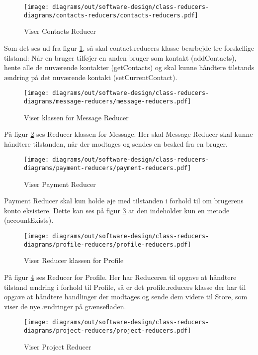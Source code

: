 \begin{figure}[H]
    \centering
\texttt{[image: diagrams/out/software-design/class-reducers-diagrams/contacts-reducers/contacts-reducers.pdf]}
\caption{Viser Contacts Reducer}
\label{fig:contact}
\end{figure}

Som det ses ud fra figur \ref{fig:contact}, så skal contact.reducers klasse bearbejde tre forskellige tilstand: Når en bruger tilføjer en anden bruger som kontakt (addContacts), hente alle de nuværende kontakter (getContacts) og skal kunne håndtere tilstands ændring på det nuværende kontakt (setCurrentContact).

\begin{figure}[H]
    \centering
\texttt{[image: diagrams/out/software-design/class-reducers-diagrams/message-reducers/message-reducers.pdf]}
\caption{Viser klassen for Message Reducer}
\label{fig:messagereducer}
\end{figure}

På figur \ref{fig:messagereducer} ses Reducer klassen for Message. Her skal Message Reducer skal kunne håndtere tilstanden, når der modtages og sendes en besked fra en bruger.

\begin{figure}[H]
    \centering
\texttt{[image: diagrams/out/software-design/class-reducers-diagrams/payment-reducers/payment-reducers.pdf]}
\caption{Viser Payment Reducer}
\label{fig:paymentreducer}
\end{figure}

Payment Reducer skal kun holde øje med tilstanden i forhold til om brugerens konto eksistere. Dette kan ses på figur \ref{fig:paymentreducer} at den indeholder kun en metode (accountExists).

\begin{figure}[H]
    \centering
\texttt{[image: diagrams/out/software-design/class-reducers-diagrams/profile-reducers/profile-reducers.pdf]}
\caption{Viser Reducer klassen for Profile}
\label{fig:profilereducer}
\end{figure}

På figur \ref{fig:profilereducer} ses Reducer for Profile. Her har Reduceren til opgave at håndtere tilstand ændring i forhold til Profile, så er det profile.reducers klasse der har til opgave at håndtere handlinger der modtages og sende dem videre til Store, som viser de nye ændringer på grænsefladen. 

\begin{figure}[H]
    \centering
\texttt{[image: diagrams/out/software-design/class-reducers-diagrams/project-reducers/project-reducers.pdf]}
\caption{Viser Project Reducer}
\label{fig:projectreducer}
\end{figure}

